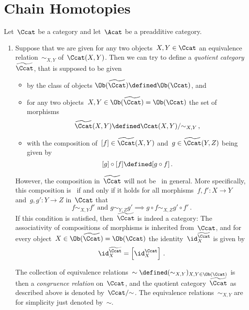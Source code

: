 \section{Chain Homotopies}


\begin{remark*}
  \label{quotient categories}
  Let~$\Ccat$ be a category and let~$\Acat$ be a preadditive category.
  \begin{enumerate}
    \item
      Suppose that we are given for any two objects~$X, Y \in \Ccat$ an equivalence relation~$\sim_{X,Y}$ of~$\Ccat(X,Y)$.
      Then we can try to define a \emph{quotient category}~$\widetilde{\Ccat}$, that is supposed to be given
      \begin{itemize}
        \item
          by the class of objects $\Ob(\widetilde{\Ccat}) \defined \Ob(\Ccat)$, and
        \item
          for any two objects~$X, Y \in \Ob(\widetilde{\Ccat}) = \Ob(\Ccat)$ the set of morphisms
          \[
                      \widetilde{\Ccat}(X,Y)
            \defined  \Ccat(X,Y)/{\sim_{X,Y}} \,,
          \]
        \item
          with the composition of~$[f] \in \widetilde{\Ccat}(X,Y)$ and~$g \in \widetilde{\Ccat}(Y,Z)$ being given by
          \[
                      [g] \circ [f]
            \defined  [g \circ f] \,.
          \]
      \end{itemize}
      However, the composition in~$\widetilde{\Ccat}$ will not be~{\welldef} in general.
      More specifically, this composition is~{\welldef} if and only if it holds for all morphisms~$f, f' \colon X \to Y$ and~$g, g' \colon Y \to Z$ in~$\Ccat$ that
      \begin{equation}
        \label{definition of congruence relation}
        \text{$f \sim_{X,Y} f'$ and~$g \sim_{Y,Z} g'$}
        \implies
        g \circ f \sim_{X,Z} g' \circ f' \,.
      \end{equation}
      If this condition is satisfied, then~$\widetilde{\Ccat}$ is indeed a category:
      The associativity of compositions of morphisms is inherited from~$\Ccat$, and for every object~$X \in \Ob(\widetilde{\Ccat}) = \Ob(\Ccat)$ the identity~$\id^{\widetilde{\Ccat}}_X$ is given by
      \[
          \id^{\widetilde{\Ccat}}_X
        = \left[ \id^{\Ccat}_X \right] \,.
      \]
      
      The collection of equivalence relations~$\sim \defined (\sim_{X,Y})_{X, Y \in \Ob(\Ccat)}$ is then a \emph{congruence relation} on~$\Ccat$, and the quotient category~$\widetilde{\Ccat}$ as described above is denoted by~$\Ccat/{\sim}$.
      The equivalence relations~$\sim_{X,Y}$ are for simplicity just denoted by~$\sim$.
      

\end{enumerate}
\end{remark*}
